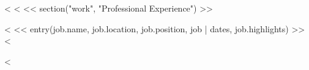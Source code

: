 <%
<%
<< section("work", "Professional Experience") >>
\begin{description}
<%
<< entry(job.name, job.location, job.position, job | dates, job.highlights) >>
<%
\end{description}

<%
